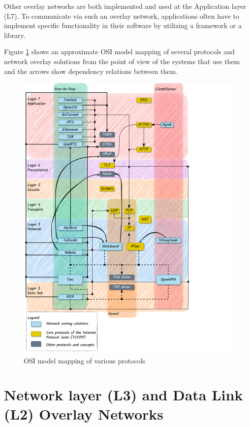 Other overlay networks are both implemented and used at the Application
layer (L7). To communicate via such an overlay network, applications
often have to implement specific functionality in their software by
utilizing a framework or a library.

Figure \ref{osi-map-overlays} shows an approximate OSI model mapping of
several protocols and network overlay solutions from the point of view
of the systems that use them and the arrows show dependency relations
between them.

\begin{figure}
\centering
\includegraphics[width=\textwidth,height=0.9\textheight]{thesis/../figures/osi-map-overlays.drawio.pdf}
\caption{OSI model mapping of various protocols
\label{osi-map-overlays}}
\end{figure}

\hypertarget{network-layer-l3-and-data-link-l2-overlay-networks}{%
\section{Network layer (L3) and Data Link (L2) Overlay
Networks}\label{network-layer-l3-and-data-link-l2-overlay-networks}}

